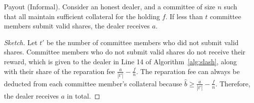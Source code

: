 \begin{theorem}{Payout (Informal).}
    Consider an honest dealer, and a committee of size $n$ such that all maintain sufficient collateral for the holding $f$.
    If less than $t$ committee members submit valid shares, the dealer receives $a$.
\end{theorem}
\begin{proof}[Sketch]
    Let $t'$ be the number of committee members who did not submit valid shares.
    Committee members who do not submit valid shares do not receive their reward, which is given to the dealer in Line 14 of Algorithm~\ref{alg:slash}, along with their share of the reparation fee $\frac{a}{|t'|} - \frac{f}{n}$.
    The reparation fee can always be deducted from each committee member's collateral because $\hat{b} \geq \frac{a}{|t'|} - \frac{f}{n}$.
    Therefore, the dealer receives $a$ in total.
\end{proof}